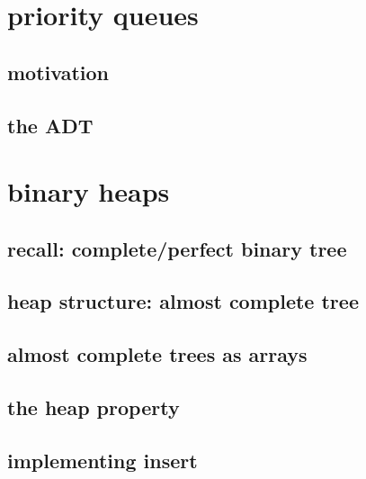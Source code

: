 
\begin{frame}
    \titlepage
\end{frame}

\section{priority queues}

\subsection{motivation}



\subsection{the ADT}



\section{binary heaps}



\subsection{recall: complete/perfect binary tree}



\subsection{heap structure: almost complete tree}



\subsection{almost complete trees as arrays}




\subsection{the heap property}

\subsection{implementing insert}


